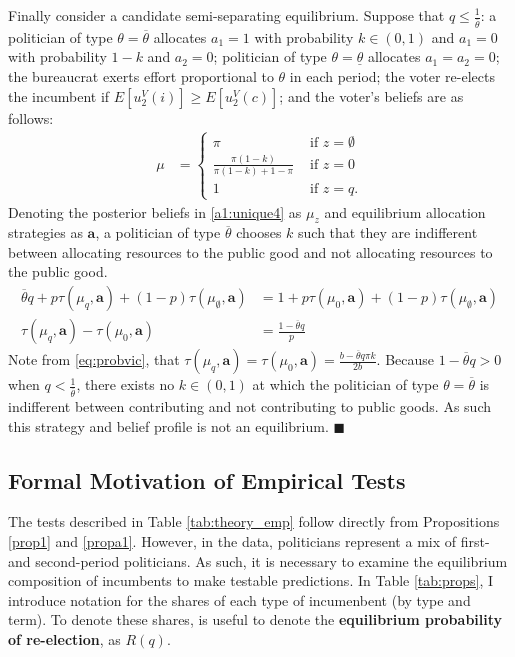\documentclass[11pt,english]{article}
\begin{document}
Finally consider a candidate semi-separating equilibrium. Suppose that $q \leq \frac{1}{\overline{\theta}}$: a politician of type $\theta = \overline{\theta}$ allocates $a_1 = 1$ with probability $k \in (0,1)$ and $a_1 = 0$ with probability $1-k$ and $a_2 =0$; politician of type  $\theta = \underline{\theta}$ allocates $a_1 = a_2 = 0$; the bureaucrat exerts effort proportional to $\theta$ in each period; the voter re-elects the incumbent if $E[u_2^V(i)] \geq E[u_2^V(c)]$; and the voter's beliefs are as follows: 
\begin{align}\label{a1:unique4}
\mu &= \begin{cases}
\pi & \text{ if }z = \emptyset\\
\frac{\pi(1-k)}{\pi(1-k) + 1-\pi} & \text{ if }z = 0\\
1 & \text{ if } z= q.
\end{cases}
\end{align}
Denoting the posterior beliefs in \eqref{a1:unique4} as $\mu_z$ and equilibrium allocation strategies as $\textbf{a}$, a politician of type $\overline{\theta}$ chooses $k$ such that they are indifferent between allocating resources to the public good and not allocating resources to the public good. 
\begin{align*}
\overline{\theta}q + p\tau(\mu_q, \boldsymbol{a}) + (1-p)\tau(\mu_\emptyset,\boldsymbol{a})&= 1+ p\tau(\mu_0, \boldsymbol{a}) + (1-p)\tau(\mu_\emptyset, \boldsymbol{a})\\
\tau(\mu_q, \boldsymbol{a})- \tau(\mu_0, \boldsymbol{a}) &= \frac{1-\overline{\theta}q}{p}
\end{align*}
Note from \eqref{eq:probvic}, that $\tau(\mu_q, \boldsymbol{a}) = \tau(\mu_0, \boldsymbol{a}) = \frac{b - \overline{\theta} q \pi k}{2b}$. Because $1-\overline{\theta}q > 0$ when $q < \frac{1}{\overline{\theta}}$, there exists no $k \in (0,1)$ at which the politician of type $\theta = \overline{\theta}$ is indifferent between contributing and not contributing to public goods. As such this strategy and belief profile is not an equilibrium. \hspace{.5cm}$\blacksquare$





\subsection{Formal Motivation of Empirical Tests}
The tests described in Table \ref{tab:theory_emp} follow directly from Propositions \ref{prop1} and \ref{propa1}. However, in the data, politicians represent a mix of first- and second-period politicians. As such, it is necessary to examine the equilibrium composition of incumbents to make testable predictions. In Table \ref{tab:props}, I introduce notation for the shares of each type of incumenbent (by type and term). To denote these shares, is useful to denote the \textbf{equilibrium probability of re-election}, as $R(q)$.  
\end{document}
